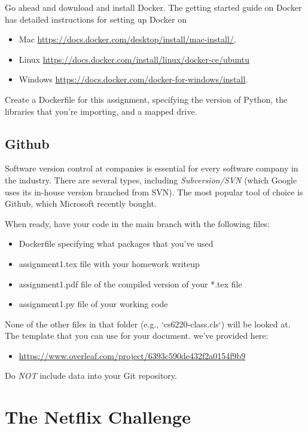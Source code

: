 \documentclass{cs6220-assignment}
\begin{document}
Go ahead and download and install Docker. The getting started guide on Docker has detailed instructions for setting up Docker on 
\begin{itemize}
    \item Mac \url{https://docs.docker.com/desktop/install/mac-install/},
    \item Linux \url{https://docs.docker.com/install/linux/docker-ce/ubuntu}
    \item Windows \url{https://docs.docker.com/docker-for-windows/install}.
\end{itemize}

Create a Dockerfile for this assignment, specifying the version of Python, the libraries that you're importing, and a mapped drive.

\subsection{Github}

Software version control at companies is essential for every software company in the industry. There are several types, including \emph{Subversion/SVN} (which Google uses its in-house version branched from SVN). The most popular tool of choice is Github, which Microsoft recently bought.

When ready, have your code in the main branch with the following files:

\begin{itemize}
    \item Dockerfile specifying what packages that you've used
    \item assignment1.tex file with your homework writeup
    \item assignment1.pdf file of the compiled version of your *.tex file
    \item assignment1.py file of your working code
\end{itemize}

None of the other files in that folder (e.g., `cs6220-class.cls`) will be looked at. The template that you can use for your document. we've provided here:
\begin{itemize}
    \item \url{https://www.overleaf.com/project/6393c590de432f2a0154f9b9}
\end{itemize}

Do \emph{NOT} include data into your Git repository.

\section{The Netflix Challenge}
\end{document}
